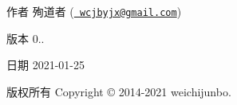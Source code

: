 \begin{DoxyAuthor}{作者}
殉道者 (\href{mailto:wcjbyjx@gmail.com}{\texttt{ wcjbyjx@gmail.\+com}}) 
\end{DoxyAuthor}
\begin{DoxyVersion}{版本}
0.. 
\end{DoxyVersion}
\begin{DoxyDate}{日期}
2021-\/01-\/25 
\end{DoxyDate}
\begin{DoxyCopyright}{版权所有}
Copyright © 2014-\/2021 weichijunbo. 
\end{DoxyCopyright}
